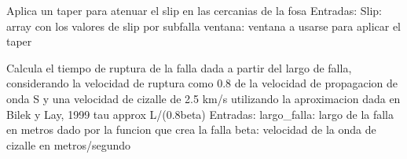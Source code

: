 \documentclass[letterpaper,10pt,english]{sphinxmanual}
\begin{document}

\begin{fulllineitems}
\label{\detokenize{main:main.taper_except_trench_tukey}}
\pysigstartsignatures
{}
\pysigstopsignatures
\end{fulllineitems}


\begin{fulllineitems}
\label{\detokenize{main:main.taper_slip_fosa}}
\pysigstartsignatures
{}
\pysigstopsignatures
\sphinxAtStartPar
Aplica un taper para atenuar el slip en las cercanias de la fosa
Entradas:
Slip: array con los valores de slip por subfalla
ventana: ventana a usarse para aplicar el taper

\end{fulllineitems}


\begin{fulllineitems}
\label{\detokenize{main:main.tau_ruptura}}
\pysigstartsignatures
{}
\pysigstopsignatures
\sphinxAtStartPar
Calcula el tiempo de ruptura de la falla dada a partir del largo de falla, considerando
la velocidad de ruptura como 0.8 de la velocidad de propagacion de onda S y 
una velocidad de cizalle de 2.5 km/s utilizando la aproximacion dada en Bilek y Lay, 1999
tau approx L/(0.8beta) 
Entradas: 
largo\_falla: largo de la falla en metros dado por la funcion que crea la falla
beta: velocidad de la onda de cizalle en metros/segundo

\end{fulllineitems}
\end{document}
